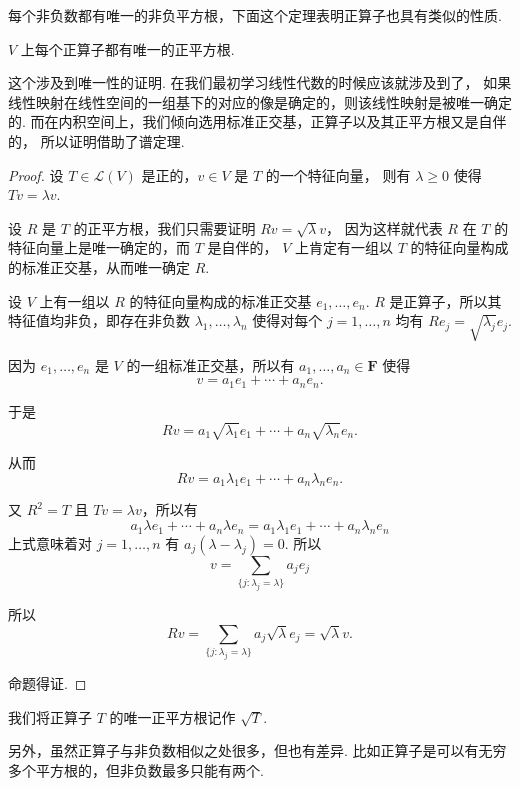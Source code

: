 每个非负数都有唯一的非负平方根，下面这个定理表明正算子也具有类似的性质. 

\begin{theorem}
    $ V $ 上每个正算子都有唯一的正平方根. 
\end{theorem}

这个涉及到唯一性的证明. 在我们最初学习线性代数的时候应该就涉及到了，
如果线性映射在线性空间的一组基下的对应的像是确定的，则该线性映射是被唯一确定的. 
而在内积空间上，我们倾向选用标准正交基，正算子以及其正平方根又是自伴的，
所以证明借助了谱定理.

\begin{proof}
    设 $ T \in \mathcal{L}(V) $ 是正的，$ v \in V $ 是 $ T $ 的一个特征向量，
    则有 $ \lambda \geqslant 0 $ 使得 $ Tv = \lambda v $. 
    
    设 $ R $ 是 $ T $ 的正平方根，我们只需要证明 $ Rv = \sqrt{\lambda} v $，
    因为这样就代表 $ R $ 在 $ T $ 的特征向量上是唯一确定的，而 $ T $ 是自伴的，
    $ V $ 上肯定有一组以 $ T $ 的特征向量构成的标准正交基，从而唯一确定 $ R $. 

    设 $ V $ 上有一组以 $ R $ 的特征向量构成的标准正交基 $ e_1, \ldots , e_n $. 
    $ R $ 是正算子，所以其特征值均非负，即存在非负数 $\lambda_1, \ldots , \lambda_n $
    使得对每个 $ j = 1, \ldots , n $ 均有 $ Re_j = \sqrt{\lambda_j}e_j $. 

    因为 $ e_1, \ldots , e_n $ 是 $ V $ 的一组标准正交基，所以有 $ a_1, \ldots , a_n \in \mathbf{F} $
    使得 
    \[
        v = a_1e_1 + \cdots + a_ne_n.  
    \]
    
    于是
    \[
        Rv = a_1\sqrt{\lambda_1}e_1 + \cdots + a_n\sqrt{\lambda_n}e_n.  
    \]

    从而
    \[
        Rv = a_1\lambda_1e_1 + \cdots + a_n\lambda_ne_n.  
    \]

    又 $ R^{2} = T $ 且 $ Tv = \lambda v $，所以有
    \[
        a_1\lambda e_1 + \cdots + a_n\lambda e_n = a_1\lambda_1e_1 + \cdots + a_n\lambda_ne_n
    \]  
    上式意味着对 $ j = 1, \ldots, n $ 有 $ a_j(\lambda - \lambda_j) = 0 $. 所以
    \[
        v = \sum_{\{j: \lambda_j = \lambda \}} a_je_j  
    \]  

    所以
    \[
        Rv = \sum_{\{j: \lambda_j = \lambda \}} a_j\sqrt{\lambda}e_j = \sqrt{\lambda}v. 
    \]
    
    命题得证. 
\end{proof}

我们将正算子 $ T $ 的唯一正平方根记作 $ \sqrt{T} $.

另外，虽然正算子与非负数相似之处很多，但也有差异. 
比如正算子是可以有无穷多个平方根的，但非负数最多只能有两个. 

